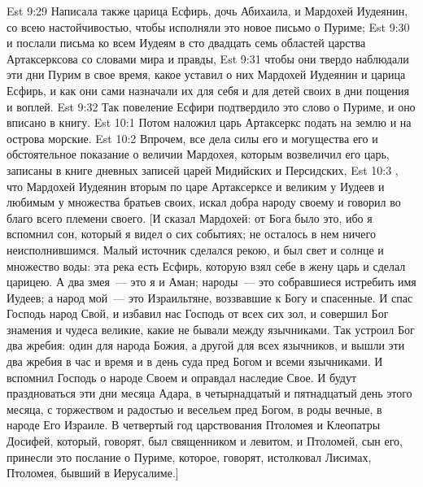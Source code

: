 \rsbpar\vs Est 9:29 Написала также царица Есфирь, дочь Абихаила, и Мардохей Иудеянин, со всею настойчивостью, чтобы исполняли это новое письмо о Пуриме;
\vs Est 9:30 и послали письма ко всем Иудеям в сто двадцать семь областей царства Артаксерксова со словами мира и правды,
\vs Est 9:31 чтобы они твердо наблюдали эти дни Пурим в свое время, какое уставил о них Мардохей Иудеянин и царица Есфирь, и как они сами назначали их для себя и для детей своих в дни пощения и воплей.
\vs Est 9:32 Так повеление Есфири подтвердило это слово о Пуриме, и оно вписано в книгу.
\vs Est 10:1 Потом наложил царь Артаксеркс подать на землю и на острова морские.
\vs Est 10:2 Впрочем, все дела силы его и могущества его и обстоятельное показание о величии Мардохея, которым возвеличил его царь, записаны в книге дневных записей царей Мидийских и Персидских,
\vs Est 10:3 , что Мардохей Иудеянин  вторым по царе Артаксерксе и великим у Иудеев и любимым у множества братьев своих,  искал добра народу своему и говорил во благо всего племени своего. [И сказал Мардохей: от Бога было это, ибо я вспомнил сон, который я видел о сих событиях; не осталось в нем ничего неисполнившимся. Малый источник сделался рекою, и был свет и солнце и множество воды: эта река есть Есфирь, которую взял себе в жену царь и сделал царицею. А два змея~--- это я и Аман; народы~--- это собравшиеся истребить имя Иудеев; а народ мой~--- это Израильтяне, воззвавшие к Богу и спасенные. И спас Господь народ Свой, и избавил нас Господь от всех сих зол, и совершил Бог знамения и чудеса великие, какие не бывали между язычниками. Так устроил Бог два жребия: один для народа Божия, а другой для всех язычников, и вышли эти два жребия в час и время и в день суда пред Богом и всеми язычниками. И вспомнил Господь о народе Своем и оправдал наследие Свое. И будут праздноваться эти дни месяца Адара, в четырнадцатый и пятнадцатый день этого месяца, с торжеством и радостью и весельем пред Богом, в роды вечные, в народе Его Израиле. В четвертый год царствования Птоломея и Клеопатры Досифей, который, говорят, был священником и левитом, и Птоломей, сын его, принесли  это послание о Пуриме, которое, говорят, истолковал Лисимах,  Птоломея, бывший в Иерусалиме.]
